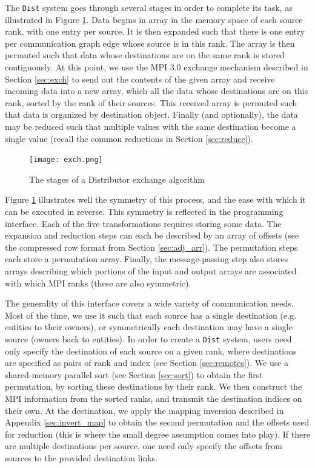 The \texttt{Dist} system goes through several stages in order
to complete its task, as illustrated in Figure \ref{fig:exch}.
Data begins in array in the memory space of each source rank,
with one entry per source.
It is then expanded such that there is one entry per communication graph
edge whose source is in this rank.
The array is then permuted such that data whose destinations are on
the same rank is stored contiguously.
At this point, we use the MPI 3.0 exchange mechanism described in
Section \ref{sec:exch} to send out the contents of the given
array and receive incoming data into a new array, which all
the data whose destinations are on this rank, sorted by the
rank of their sources.
This received array is permuted such that data is organized
by destination object.
Finally (and optionally), the data may be reduced such that
multiple values with the same destination become a single
value (recall the common reductions in Section \ref{sec:reduce}).

\begin{figure}[t]\vspace*{4pt}
\centerline{\texttt{[image: exch.png]}}
\caption{The stages of a Distributor exchange algorithm}\vspace*{-6pt}
\label{fig:exch}
\end{figure}

Figure \ref{fig:exch} illustrates well the symmetry of this process,
and the ease with which it can be executed in reverse.
This symmetry is reflected in the programming interface.
Each of the five transformations requires storing some data.
The expansion and reduction steps can each be described by an array
of offsets (see the compressed row format from Section \ref{sec:adj_arr}).
The permutation steps each store a permutation array.
Finally, the message-passing step also stores arrays describing which
portions of the input and output arrays are associated with which
MPI ranks (these are also symmetric).

The generality of this interface covers a wide variety of communication
needs.
Most of the time, we use it such that each source has a single destination
(e.g. entities to their owners), or symmetrically each destination may
have a single source (owners back to entities).
In order to create a \texttt{Dist} system, users need only specify
the destination of each source on a given rank, where destinations
are specified as pairs of rank and index (see Section \ref{sec:remotes}).
We use a shared-memory parallel sort (see Section \ref{sec:sort}) to
obtain the first permutation, by sorting these destinations by their rank.
We then construct the MPI information from the sorted ranks, and transmit
the destination indices on their own.
At the destination, we apply the mapping inversion described in
Appendix \ref{sec:invert_map} to obtain the second permutation and
the offsets used for reduction (this is where the small degree assumption
comes into play).
If there are multiple destinations per source, one need only specify
the offsets from sources to the provided destination links.


